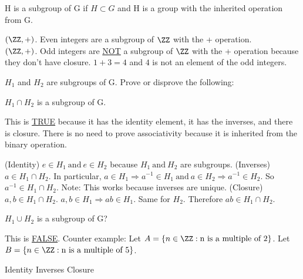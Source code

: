 \documentclass[class=scrartcl, crop=false]{standalone}
\begin{document}
\begin{definition}
  H is a subgroup of G if $H \subset G$ and H is a group with the inherited operation from G.
\end{definition}

\begin{example}
  $(\ZZ, +)$. Even integers are a subgroup of $\ZZ$ with the + operation. \\
  $(\ZZ, +)$. Odd integers are \ul{NOT} a subgroup of $\ZZ$ with the + operation because they don't have closure. $1 + 3 = 4$ and $4$ is not an element of the odd integers.
\end{example}

\begin{exercise}
  $H_1$ and $H_2$ are subgroups of G. Prove or disprove the following:
  \begin{enumerate}
    \ii $H_1 \cap H_2$ is a subgroup of G.

    This is \ul{TRUE} because it has the identity element, it has the inverses, and there is closure. There is no need to prove associativity because it is inherited from the binary operation.
    \begin{enumerate}
      \ii (Identity)
      $e \in H_1 \ \text{and} \ e \in H_2$ because $H_1 \ \text{and} \ H_2$ are subgroups.
      \ii (Inverses)
      $a \in H_1 \cap H_2$. In particular, $a \in H_1 \Rightarrow a^{-1} \in H_1 \ \text{and} \ a \in H_2 \Rightarrow a^{-1} \in H_2$. So $a^{-1} \in H_1 \cap H_2$. Note: This works because inverses are unique.
      \ii (Closure)
      $a, b \in H_1 \cap H_2$. $a, b \in H_1 \Rightarrow ab \in H_1$. Same for $H_2$. Therefore $ab \in H_1 \cap H_2$.
    \end{enumerate}
    \ii $H_1 \cup H_2$ is a subgroup of G? 

    This is \ul{FALSE}. Counter example: Let $A = \{n \in \ZZ: \text{n is a multiple of 2}\}$. Let $B = \{n \in \ZZ: \text{n is a multiple of 5}\}$. 
    \begin{enumerate}
      \ii
      Identity \cmark
      \ii
      Inverses \cmark
      \ii
      Closure \xmark
    \end{enumerate}

  \end{enumerate}
\end{exercise}
\end{document}
